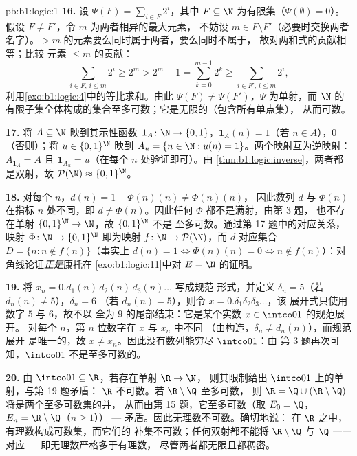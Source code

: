 \begin{solution}{pb:b1:logic:1}
\textbf{16.} 设 $\Psi(F) = \sum_{i \in F} 2^i$，其中 $F \subseteq \N$
为有限集（$\Psi(\emptyset) = 0$）。假设 $F \neq F'$，令 $m$ 为两者相异的最大元素，
不妨设 $m \in F \setminus
F'$（必要时交换两者名字）。$> m$ 的元素要么同时属于两者，要么同时不属于，
故对两和式的贡献相等；比较
元素 $\leq m$ 的贡献：
\[
\sum_{i \in F,\, i \leq m} 2^i \geq 2^m
> 2^m - 1 = \sum_{k=0}^{m-1} 2^k
\geq \sum_{i \in F',\, i \leq m} 2^i ,
\]
利用\cref{exo:b1:logic:4}中的等比求和。由此 $\Psi(F)
\neq \Psi(F')$，$\Psi$ 为单射，而
$\N$ 的有限子集全体构成的集合至多可数；它是无限的（包含所有单点集），
从而可数。

\textbf{17.} 将 $A \subseteq \N$ 映到其示性函数 $\mathbf 1_A
\colon \N \to \{0,1\}$，$\mathbf 1_A(n) = 1$（若 $n \in A$），$0$
（否则）；将 $u \in \{0,1\}^{\N}$ 映到 $A_u = \{n \in \N : u(n) =
1\}$。两个映射互为逆映射：$A_{\mathbf 1_A} = A$ 且
$\mathbf 1_{A_u} = u$（在每个 $n$ 处验证即可）。由
\cref{thm:b1:logic:inverse}，两者都是双射，故 $\mathcal{P}(\N)
\approx \{0,1\}^{\N}$。

\textbf{18.} 对每个 $n$，$d(n) = 1 - \Phi(n)(n) \neq \Phi(n)(n)$，
因此数列 $d$ 与 $\Phi(n)$ 在指标 $n$ 处不同，即 $d \neq
\Phi(n)$。因此任何 $\Phi$ 都不是满射，由第 3 题，
也不存在单射 $\{0,1\}^{\N} \to \N$，故 $\{0,1\}^{\N}$ 不是
至多可数。通过第 17 题中的对应关系，映射 $\Phi
\colon \N \to \{0,1\}^{\N}$ 即为映射 $f \colon \N \to
\mathcal{P}(\N)$，而 $d$ 对应集合 $D = \{n : n
\notin f(n)\}$（事实上 $d(n) = 1 \iff \Phi(n)(n) = 0 \iff n \notin
f(n)$）：对角线论证\emph{正是}康托在
\cref{exo:b1:logic:11}中对 $E = \N$ 的证明。

\textbf{19.} 将 $x_n = 0.d_1(n)\,d_2(n)\,d_3(n)\dots$ 写成规范
形式，并定义 $\delta_n = 5$（若 $d_n(n) \neq 5$），$\delta_n = 6$
（若 $d_n(n) = 5$），则令 $x = 0.\delta_1\delta_2\delta_3\dots$，该
展开式只使用数字 $5$ 与 $6$，故不以
全为 $9$ 的尾部结束：它是某个实数 $x \in \intco01$ 的规范展开。
对每个 $n$，第 $n$ 位数字在 $x$ 与 $x_n$ 中不同
（由构造，$\delta_n \neq d_n(n)$），而规范展开
是唯一的，故 $x \neq x_n$。因此没有数列能穷尽 $\intco01$：由
第 3 题再次可知，$\intco01$ 不是至多可数的。

\textbf{20.} 由 $\intco01 \subseteq \R$，若存在单射 $\R \to \N$，
则其限制给出 $\intco01$ 上的单射，与第 19 题矛盾：
$\R$ 不可数。若 $\R \setminus \Q$ 至多可数，
则 $\R = \Q \cup (\R \setminus \Q)$ 将是两个至多可数集的并，
从而由第 15 题，它至多可数（取
$E_0 = \Q$，$E_n = \R \setminus \Q$（$n \geq 1$）） ---
矛盾。因此无理数不可数。确切地说：
在 $\R$ 之中，有理数构成可数集，而它们的
补集不可数；任何双射都不能将 $\R
\setminus \Q$ 与 $\Q$ 一一对应 --- 即无理数严格多于有理数，
尽管两者都无限且都稠密。


\end{solution}
